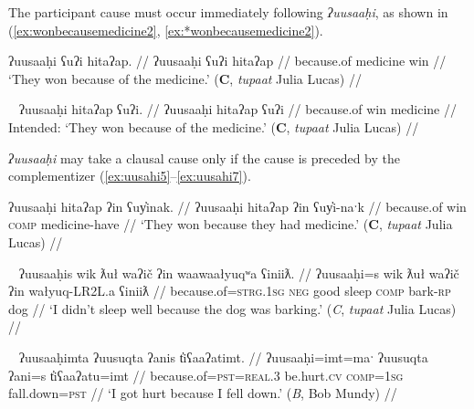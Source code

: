 The participant cause must occur immediately following \textit{ʔuusaaḥi}, as shown in (\ref{ex:wonbecausemedicine2}, \ref{ex:*wonbecausemedicine2}).

\ex \label{ex:wonbecausemedicine2}
\begingl
\glpreamble ʔuusaaḥi ʕuʔi hitaʔap. //
\gla ʔuusaaḥi ʕuʔi hitaʔap //
\glb because.of medicine win //
\glft `They won because of the medicine.' (\textbf{C}, \textit{tupaat} Julia Lucas) //
\endgl
\xe

\ex~ \label{ex:*wonbecausemedicine2}
\begingl
\glpreamble *ʔuusaaḥi hitaʔap ʕuʔi. //
\gla ʔuusaaḥi hitaʔap ʕuʔi //
\glb because.of win medicine //
\glft Intended: `They won because of the medicine.' (\textbf{C}, \textit{tupaat} Julia Lucas) //
\endgl
\xe

\textit{ʔuusaaḥi} may take a clausal cause only if the cause is preceded by the complementizer (\ref{ex:uusahi5}--\ref{ex:uusahi7}).

\ex \label{ex:uusahi5}
\begingl
\glpreamble ʔuusaaḥi hitaʔap ʔin ʕuy̓inak. //
\gla ʔuusaaḥi hitaʔap ʔin ʕuy̓i-naˑk //
\glb because.of win \textsc{comp} medicine-have  //
\glft `They won because they had medicine.' (\textbf{C}, \textit{tupaat} Julia Lucas) //
\endgl
\xe

\ex~ \label{ex:uusahi6}
\begingl
\glpreamble ʔuusaaḥis wik ƛuł waʔič ʔin waawaałyuqʷa ʕiniiƛ. //
\gla ʔuusaaḥi=s wik ƛuł waʔič ʔin wałyuq-LR2L.a ʕiniiƛ //
\glb because.of=\textsc{strg.1sg} \textsc{neg} good sleep \textsc{comp} bark-\textsc{rp} dog  //
\glft `I didn't sleep well because the dog was barking.' (\textit{C}, \textit{tupaat} Julia Lucas) //
\endgl
\xe

\ex~ \label{ex:uusahi7}
\begingl
\glpreamble ʔuusaaḥimta ʔuusuqta ʔanis t̓iʕaaʔatimt. //
\gla ʔuusaaḥi=imt=maˑ ʔuusuqta ʔani=s t̓iʕaaʔatu=imt //
\glb because.of=\textsc{pst}=\textsc{real.3} be.hurt.\textsc{cv} \textsc{comp}=\textsc{1sg} fall.down=\textsc{pst}  //
\glft `I got hurt because I fell down.' (\textit{B}, Bob Mundy) //
\endgl
\xe

\begin{comment}
[[TODO: uusahi plus linker ]]
\textit{ʔuusaaḥi} may only be able to take the linker when it is non-initial. Both consultants with whom I attempted to add a linker to an ʔuusaaḥi-initial sentence were uncertain if it was okay or not but felt it was weird (\ref{ex:uusahi7}, \ref{ex:uusahi8}).

\ex \label{ex:uusahi7}
\begingl
\glpreamble ?? ʔuusaaḥiqḥita nay̓aqakʔi wikitaḥ ƛuł weʔič. //
\gla ʔuusaaḥi-(q)ḥ=(m)it=(m)aˑ nay̓aqak=ʔiˑ wik=(m)it=(m)aˑḥ ƛuł weʔič //
\glb because.of-\textsc{link}=\textsc{pst}=\textsc{real.3} baby=\textsc{art} \textsc{neg}=\textsc{pst}=\textsc{real.1sg} good sleep //
\glft Intended: `I didn't sleep well because of the baby.' (\textbf{B}, Bob Mundy) //
\endgl
\xe

*? ʔuusaaḥiqḥʔiš ʔuusaqta wik̓aałukʷint

ʔuusaqtumtʔiš ʔuusaaḥiqḥ wik̓aałukʷint
\end{comment}

